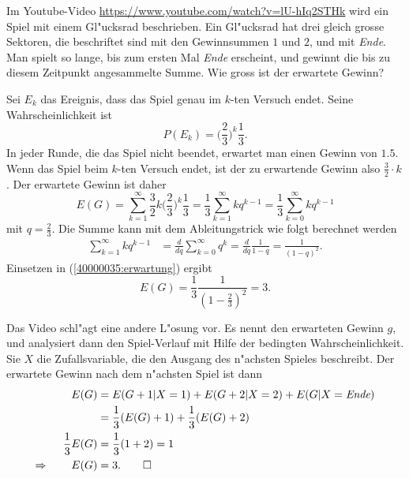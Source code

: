 Im Youtube-Video
\url{https://www.youtube.com/watch?v=lU-hIq2STHk}
wird ein Spiel mit einem Gl"ucksrad beschrieben.
Ein Gl"ucksrad hat drei gleich grosse Sektoren, die beschriftet sind mit
den Gewinnsummen $1$ und $2$, und mit {\em Ende}.
Man spielt so lange, bis zum ersten Mal {\em Ende} erscheint, und gewinnt 
die bis zu diesem Zeitpunkt angesammelte Summe.
Wie gross ist der erwartete Gewinn?

\begin{loesung}
Sei $E_k$ das Ereignis, dass das Spiel genau im $k$-ten Versuch endet.
Seine Wahrscheinlichkeit ist
\[
P(E_k)=\biggl(\frac23\biggr)^k\frac13.
\]
In jeder Runde, die das Spiel nicht beendet, erwartet man einen Gewinn von $1.5$.
Wenn das Spiel beim $k$-ten Versuch endet, ist der zu erwartende Gewinn also
$\frac32\cdot k$.
Der erwartete Gewinn ist daher
\begin{equation}
E(G)
=
\sum_{k=1}^\infty \frac32k\biggl(\frac23\biggr)^k\frac13
=
\frac13\sum_{k=1}^\infty kq^{k-1}
=
\frac13\sum_{k=0}^\infty kq^{k-1}
\label{40000035:erwartung}
\end{equation}
mit $q=\frac23$.
Die Summe kann mit dem Ableitungstrick wie folgt berechnet werden
\begin{align*}
\sum_{k=1}^\infty kq^{k-1}
&=
\frac{d}{dq} \sum_{k=0}^\infty q^k
=
\frac{d}{dq} \frac{1}{1-q}
=
\frac1{(1-q)^2}.
\end{align*}
Einsetzen in (\ref{40000035:erwartung}) ergibt
\[
E(G)=\frac13\frac1{(1-\frac23)^2}=3.
\]

Das Video schl"agt eine andere L"osung vor.  
Es nennt den erwarteten Gewinn $g$, und analysiert dann den Spiel-Verlauf mit
Hilfe der bedingten Wahrscheinlichkeit.
Sie $X$ die Zufallsvariable, die den Ausgang des n"achsten Spieles beschreibt.
Der erwartete Gewinn nach dem n"achsten Spiel ist dann
\begin{align*}
E(G)
&=
E(G+1|X=1)+E(G+2|X=2)+E(G|X=\text{\em Ende})
\\
&=
\frac13(E(G)+1) + \frac13(E(G)+2)
\\
\frac13E(G)
&=\frac13(1+2)=1
\\
\Rightarrow\qquad E(G)&=3.
\qedhere
\end{align*}
\end{loesung}

